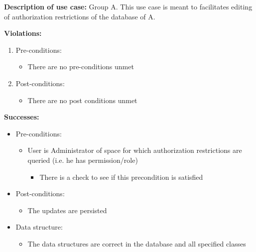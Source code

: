 \textbf{Description of use case:}\newline
Group A.
This use case is meant to facilitates editing of authorization restrictions of the database of A.
\medskip

\textbf{Violations:}
\begin{enumerate}

	\item Pre-conditions:
	\begin{itemize}
		\item There are no pre-conditions unmet
	\end{itemize}
	
	\item Post-conditions:
	\begin{itemize}
		\item There are no post conditions unmet
	\end{itemize}
		
\end{enumerate}

\textbf{Successes:}
\begin{itemize}

	
\item Pre-conditions:
	\begin{itemize}
		\item User is Administrator of space for which authorization restrictions are queried (i.e. he has permission/role)
			\begin{itemize}
					\item There is a check to see if this precondition is satisfied
			\end{itemize}
	\end{itemize}
		
	\item Post-conditions:
		\begin{itemize}
			\item The updates are persisted
		\end{itemize}
		
	\item Data structure:
		\begin{itemize}
			\item The data structures are correct in the database and all specified classes
		\end{itemize}
\end{itemize}

\noindent
\medskip

